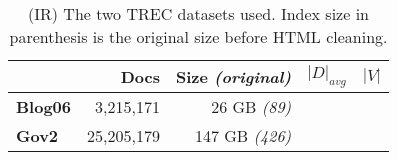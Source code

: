 \begin{table}
\centering
{\small
\begin{tabular}{|l|r|r|r|r|}
    \hline & \textbf{Docs} & \textbf{Size} \emph{(original)} & \textbf{$|D|_{avg}$} &
    \textbf{$|V|$} \\
    \hline
    \textbf{Blog06} & 3,215,171 & 26 GB \emph{(89)} & & \\
    \textbf{Gov2} & 25,205,179 & 147 GB \emph{(426)} & & \\
    \hline
\end{tabular}
\caption{(IR) The two TREC datasets used. Index size in parenthesis is the
original size before HTML cleaning.}
\label{table:ir-datasets}
}
\end{table}

